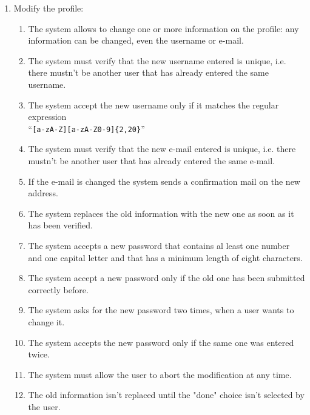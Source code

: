 \begin{enumerate}
\item Modify the profile:
\begin{enumerate}
\item The system allows to change one or more information on the profile: any information can be changed, even the username or e-mail.
\item The system must verify that the new username entered is unique, i.e. there mustn't be another user that has already entered the same username. 
\item  The system accept the new username only if it matches the regular expression\\``\texttt{[a-zA-Z][a-zA-Z0-9]\{2,20\}}'' 
\item The system must verify that the new e-mail entered is unique, i.e. there mustn't be another user that has already entered the same e-mail. 
\item If the e-mail is changed the system sends a confirmation mail on the new address.
\item The system replaces the old information with the new one as soon as it has been verified.
\item The system accepts a new password that contains al least one number and one capital letter and that has a minimum length of eight characters.
\item The system accept a new password only if the old one has been submitted correctly before.
\item The system asks for the new password two times, when a user wants to change it.
\item The system accepts the new password only if the same one was entered twice.
\item The system must allow the user to abort the modification at any time.
\item The old information isn't  replaced until the "done" choice isn't selected by the user.
\end{enumerate}




\end{enumerate}




